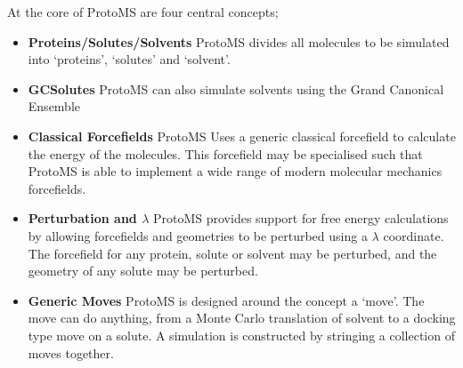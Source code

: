 \documentclass[letterpaper,10pt,english]{sphinxmanual}
\begin{document}
At the core of ProtoMS are four central concepts;
\begin{itemize}
\item {} 
\textbf{Proteins/Solutes/Solvents} ProtoMS divides all molecules to be simulated into ‘proteins’, ‘solutes’ and ‘solvent’.

\item {} 
\textbf{GCSolutes} ProtoMS can also simulate solvents using the Grand Canonical Ensemble

\item {} 
\textbf{Classical Forcefields} ProtoMS Uses a generic classical forcefield to calculate the energy of the molecules. This forcefield may be specialised such that ProtoMS is able to implement a wide range of modern molecular mechanics forcefields.

\item {} 
\textbf{Perturbation and \(\lambda\)} ProtoMS provides support for free energy calculations by allowing forcefields and geometries to be perturbed using a \(\lambda\) coordinate. The forcefield for any protein, solute or solvent may be perturbed, and the geometry of any solute may be perturbed.

\item {} 
\textbf{Generic Moves} ProtoMS is designed around the concept a ‘move’. The move can do anything, from a Monte Carlo translation of solvent to a docking type move on a solute. A simulation is constructed by stringing a collection of moves together.

\end{itemize}
\end{document}
